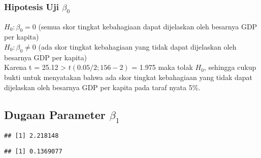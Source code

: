 \documentclass[
]{article}
\newenvironment{Shaded}{\begin{snugshade}}{\end{snugshade}}
\newcommand{\AttributeTok}[1]{\textcolor[rgb]{0.13,0.29,0.53}{#1}}
\newcommand{\DecValTok}[1]{\textcolor[rgb]{0.00,0.00,0.81}{#1}}
\newcommand{\FunctionTok}[1]{\textcolor[rgb]{0.13,0.29,0.53}{\textbf{#1}}}
\newcommand{\NormalTok}[1]{#1}
\newcommand{\OtherTok}[1]{\textcolor[rgb]{0.56,0.35,0.01}{#1}}
\newcommand{\SpecialCharTok}[1]{\textcolor[rgb]{0.81,0.36,0.00}{\textbf{#1}}}
\newcommand{\StringTok}[1]{\textcolor[rgb]{0.31,0.60,0.02}{#1}}
\begin{document}
\hypertarget{hipotesis-uji-beta_0}{%
\subsubsection{\texorpdfstring{ Hipotesis Uji
\(\beta_0\)}{ Hipotesis Uji \textbackslash beta\_0}}\label{hipotesis-uji-beta_0}}

\(H_0:\beta_0=0\) (semua skor tingkat kebahagiaan dapat dijelaskan oleh
besarnya GDP per kapita)\\
\(H_0:\beta_0≠0\) (ada skor tingkat kebahagiaan yang tidak dapat
dijelaskan oleh besarnya GDP per kapita)\\
Karena t = 25.12 \textgreater{} \(t(0.05/2;156-2)\) = 1.975 maka tolak
\(H_0\), sehingga cukup bukti untuk menyatakan bahwa ada skor tingkat
kebahagiaan yang tidak dapat dijelaskan oleh besarnya GDP per kapita
pada taraf nyata 5\%.

\hypertarget{dugaan-parameter-beta_1}{%
\subsection{\texorpdfstring{ Dugaan Parameter
\(\beta_1\)}{ Dugaan Parameter \textbackslash beta\_1}}\label{dugaan-parameter-beta_1}}

\begin{Shaded}
\end{Shaded}

\begin{verbatim}
## [1] 2.218148
\end{verbatim}

\begin{Shaded}
\end{Shaded}

\begin{verbatim}
## [1] 0.1369077
\end{verbatim}
\end{document}
